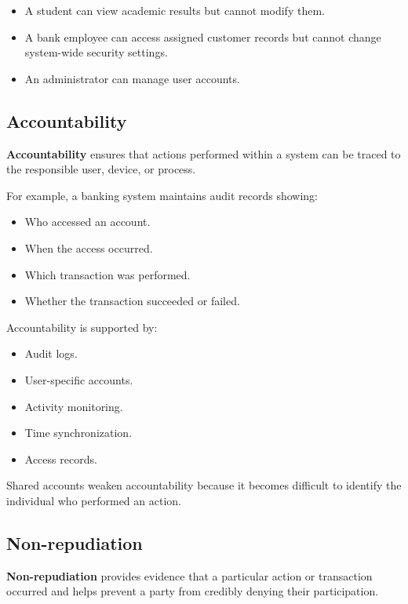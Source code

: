 \begin{itemize}
\item A student can view academic results but cannot modify them.
\item A bank employee can access assigned customer records but cannot change system-wide security settings.
\item An administrator can manage user accounts.
\end{itemize}

\subsection{Accountability}

\textbf{Accountability} ensures that actions performed within a system can be traced to the responsible user, device, or process.

For example, a banking system maintains audit records showing:

\begin{itemize}
\item Who accessed an account.
\item When the access occurred.
\item Which transaction was performed.
\item Whether the transaction succeeded or failed.
\end{itemize}

Accountability is supported by:

\begin{itemize}
\item Audit logs.
\item User-specific accounts.
\item Activity monitoring.
\item Time synchronization.
\item Access records.
\end{itemize}

Shared accounts weaken accountability because it becomes difficult to identify the individual who performed an action.

\subsection{Non-repudiation}

\textbf{Non-repudiation} provides evidence that a particular action or transaction occurred and helps prevent a party from credibly denying their participation.

